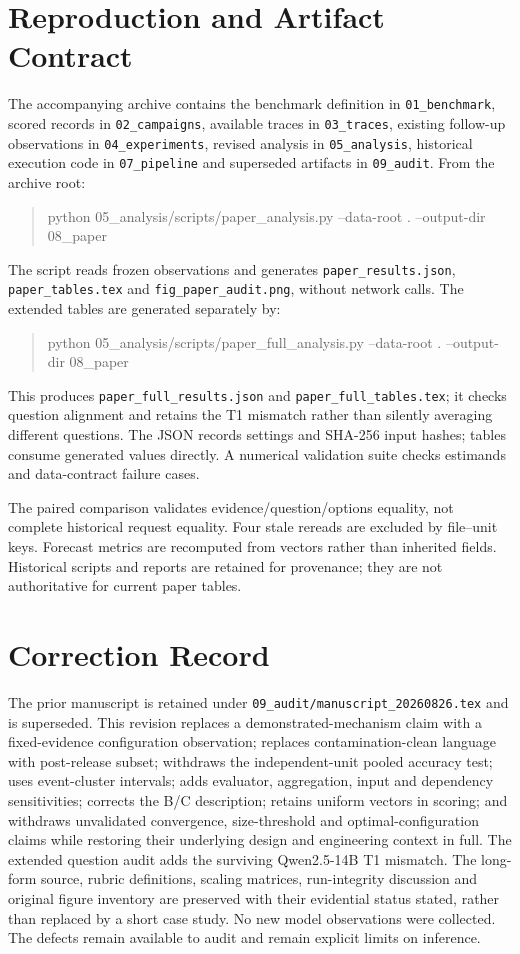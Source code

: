 \documentclass[10pt,conference]{IEEEtran}
\begin{document}
\section{Reproduction and Artifact Contract}
\label{sec:reproduce}
\label{sec:data_audit}
The accompanying archive contains the benchmark definition in
\texttt{01\_benchmark}, scored records in \texttt{02\_campaigns}, available
traces in \texttt{03\_traces}, existing follow-up observations in
\texttt{04\_experiments}, revised analysis in \texttt{05\_analysis},
historical execution code in \texttt{07\_pipeline} and superseded artifacts
in \texttt{09\_audit}. From the archive root:
\begin{quote}\small\ttfamily\raggedright
python 05\_analysis/scripts/paper\_analysis.py
--data-root . --output-dir 08\_paper
\end{quote}
The script reads frozen observations and generates \texttt{paper\_results.json},
\texttt{paper\_tables.tex} and \texttt{fig\_paper\_audit.png}, without network
calls. The extended tables are generated separately by:
\begin{quote}\small\ttfamily\raggedright
python 05\_analysis/scripts/paper\_full\_analysis.py
--data-root . --output-dir 08\_paper
\end{quote}
This produces \texttt{paper\_full\_results.json} and
\texttt{paper\_full\_tables.tex}; it checks question alignment and retains the
T1 mismatch rather than silently averaging different questions.
The JSON records settings and SHA-256 input hashes; tables consume
generated values directly. A numerical validation suite checks estimands
and data-contract failure cases.

The paired comparison validates evidence/question/options equality, not
complete historical request equality. Four stale rereads are excluded by
file--unit keys. Forecast metrics are recomputed from vectors rather than
inherited fields. Historical scripts and reports are retained for provenance;
they are not authoritative for current paper tables.

\section{Correction Record}
The prior manuscript is retained under
\texttt{09\_audit/manuscript\_20260826.tex} and is superseded.
This revision replaces a demonstrated-mechanism claim with a fixed-evidence
configuration observation; replaces contamination-clean language with
post-release subset; withdraws the independent-unit pooled accuracy test;
uses event-cluster intervals; adds evaluator, aggregation, input and dependency
sensitivities; corrects the B/C description; retains uniform vectors in scoring;
and withdraws unvalidated convergence, size-threshold and optimal-configuration
claims while restoring their underlying design and engineering context in full.
The extended question audit adds the surviving Qwen2.5-14B T1 mismatch.
The long-form source, rubric definitions, scaling matrices, run-integrity
discussion and original figure inventory are preserved with their evidential
status stated, rather than replaced by a short case study. No new model observations were collected. The defects remain
available to audit and remain explicit limits on inference.
\end{document}
